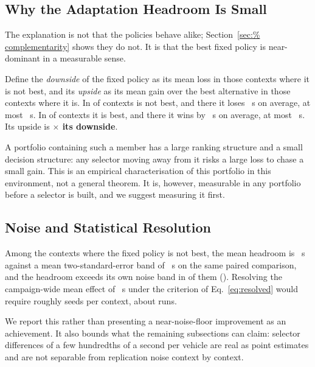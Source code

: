 \subsection{Why the Adaptation Headroom Is Small}
\label{sec:asymmetry}

The explanation is not that the policies behave alike; Section~\ref{sec:%
complementarity} shows they do not. It is that the best fixed policy is
near-dominant in a measurable sense.

Define the \emph{downside} of the fixed policy as its mean loss in those
contexts where it is not best, and its \emph{upside} as its mean gain over the
best alternative in those contexts where it is. In \NumAsymNotBestPct{} of
contexts \NumGlobalSBS{} is not best, and there it loses \NumAsymLoss~s on
average, at most \NumAsymMaxLoss~s. In \NumAsymBestPct{} of contexts it is best,
and there it wins by \NumAsymMargin~s on average, at most \NumAsymMaxMargin~s.
Its upside is \textbf{\NumAsymRatio$\times$ its downside}.

A portfolio containing such a member has a large ranking structure and a small
decision structure: any selector moving away from it risks a large loss to
chase a small gain. This is an empirical characterisation of this portfolio in
this environment, not a general theorem. It is, however, measurable in any
portfolio before a selector is built, and we suggest measuring it first.

\subsection{Noise and Statistical Resolution}

Among the \NumResolvNContexts{} contexts where the fixed policy is not best, the
mean headroom is \NumResolvHeadroomNZ~s against a mean two-standard-error band
of \NumResolvNoiseNZ~s on the same paired comparison, and the headroom exceeds
its own noise band in \NumResolvExceeds{} of them (\NumResolvExceedsPct{}).
Resolving the campaign-wide mean effect of \NumResolvHeadroom~s under the
criterion of Eq.~\ref{eq:resolved} would require roughly
\NumResolvSeedsNeeded{} seeds per context, about \NumResolvRunsNeeded{} runs.

We report this rather than presenting a near-noise-floor improvement as an
achievement. It also bounds what the remaining subsections can claim: selector
differences of a few hundredths of a second per vehicle are real as point
estimates and are not separable from replication noise context by context.

